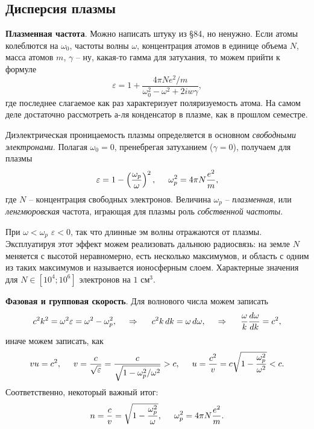 \subsection{Дисперсия плазмы}


\textbf{Плазменная частота}. Можно написать штуку из \S 84, но ненужно. 
Если атомы колеблются на $\omega_0$, частоты волны $\omega$, концентрация атомов в единице объема $N$, масса атомов $m$, $\gamma$ -- ну, какая-то гамма для затухания, то можем прийти к формуле
\begin{equation*}
    \varepsilon = 1 + \frac{4 \pi N e^2/m}{\omega_0^2 - \omega^2 + 2 i w \gamma},
\end{equation*}
где последнее слагаемое как раз характеризует поляризуемость атома. 
На самом деле достаточно рассмотреть а-ля конденсатор в плазме, как в прошлом семестре. 

Диэлектрическая проницаемость плазмы определяется в основном \textit{свободными электронами}. Полагая $\omega_0 = 0$, пренебрегая затуханием ($\gamma=0$), получаем для плазмы
\begin{equation*}
    \varepsilon = 1 - \left(\frac{\omega_p}{\omega}\right)^2,
    \hspace{5 mm} 
    \omega_p^2 = 4 \pi N\frac{e^2}{m},
\end{equation*}
где $N$ -- концентрация свободных электронов. Величина $\omega_p$ -- \textit{плазменная}, или \textit{ленгмюровская} частота, играющая для плазмы роль \textit{собственной частоты}. 



При $\omega < \omega_p$ $\varepsilon < 0$, так что длинные эм волны отражаются от плазмы. Эксплуатируя этот эффект можем реализовать дальнюю радиосвязь: на земле $N$ меняется с высотой неравномерно, есть несколько максимумов, и область с одним из таких максимумов и называется ионосферным слоем. Характерные значения для $N \in [10^4; 10^6]$ электронов на $1$ см$^3$. 


\textbf{Фазовая и групповая скорость}. Для волнового числа можем записать
\begin{equation*}
    c^2 k^2 = \omega^2 \varepsilon = \omega^2 - \omega^2_p,
    \hspace{0.5cm} \Rightarrow \hspace{0.5cm}   
    c^2 k \, d k = \omega \, d \omega,
    \hspace{0.5cm} \Rightarrow \hspace{0.5cm}
    \frac{\omega}{k} \frac{d \omega}{d k}  = c^2,
\end{equation*}
иначе можем записать, как
\begin{equation*}
    v u = c^2, \hspace{5 mm} 
    v = \frac{c}{\sqrt{\varepsilon}} = \frac{c}{\sqrt{1-\omega_p^2/\omega^2}} > c,
    \hspace{5 mm} 
    u = \frac{c^2}{v} = c \sqrt{1- \frac{\omega_p^2}{\omega^2}} < c.
\end{equation*}
Соответственно, некоторый важный итог:
\begin{equation*}
    n = \frac{c}{v} = \sqrt{1- \frac{\omega_p^2}{\omega}}, \hspace{5 mm} 
    \omega_p^2 = 4 \pi N \frac{e^2}{m}.
\end{equation*}